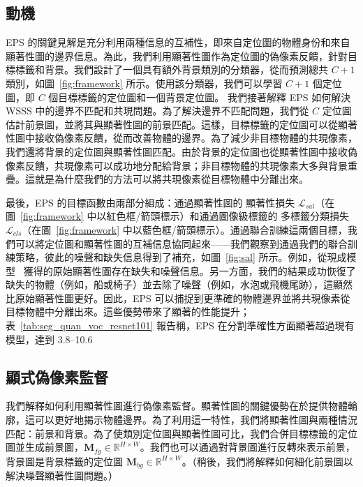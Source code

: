 \documentclass[final]{cvpr}
\begin{document}
\subsection{動機}
\label{section3.1}

EPS 的關鍵見解是充分利用兩種信息的互補性，即來自定位圖的物體身份和來自顯著性圖的邊界信息。為此，我們利用顯著性圖作為定位圖的偽像素反饋，針對目標標籤和背景。我們設計了一個具有額外背景類別的分類器，從而預測總共 $C+1$ 類別，如圖~\ref{fig:framework} 所示。使用該分類器，我們可以學習 $C+1$ 個定位圖，即 $C$ 個目標標籤的定位圖和一個背景定位圖。
我們接著解釋 EPS 如何解決 WSSS 中的邊界不匹配和共現問題。為了解決邊界不匹配問題，我們從 $C$ 定位圖估計前景圖，並將其與顯著性圖的前景匹配。這樣，目標標籤的定位圖可以從顯著性圖中接收偽像素反饋，從而改善物體的邊界。為了減少非目標物體的共現像素，我們還將背景的定位圖與顯著性圖匹配。由於背景的定位圖也從顯著性圖中接收偽像素反饋，共現像素可以成功地分配給背景；非目標物體的共現像素大多與背景重疊。這就是為什麼我們的方法可以將共現像素從目標物體中分離出來。

最後，EPS 的目標函數由兩部分組成：通過顯著性圖的 {顯著性損失} $\mathcal{L}_{sal}$（在圖~\ref{fig:framework} 中以紅色框/箭頭標示）和通過圖像級標籤的 {多標籤分類損失} $\mathcal{L}_{cls}$（在圖~\ref{fig:framework} 中以藍色框/箭頭標示）。通過聯合訓練這兩個目標，我們可以將定位圖和顯著性圖的互補信息協同起來——我們觀察到通過我們的聯合訓練策略，彼此的噪聲和缺失信息得到了補充，如圖~\ref{fig:sal} 所示。例如，從現成模型~\cite{hou2017deeply,nguyen2019deepusps,zhao2019pyramid} 獲得的原始顯著性圖存在缺失和噪聲信息。另一方面，我們的結果成功恢復了缺失的物體（例如，船或椅子）並去除了噪聲（例如，水泡或飛機尾跡），這顯然比原始顯著性圖更好。因此，EPS 可以捕捉到更準確的物體邊界並將共現像素從目標物體中分離出來。這些優勢帶來了顯著的性能提升；表~\ref{tab:seg_quan_voc_resnet101} 報告稱，EPS 在分割準確性方面顯著超過現有模型，達到 3.8--10.6%

\subsection{顯式偽像素監督}\label{section3.2}

我們解釋如何利用顯著性圖進行偽像素監督。顯著性圖的關鍵優勢在於提供物體輪廓，這可以更好地揭示物體邊界。為了利用這一特性，我們將顯著性圖與兩種情況匹配：前景和背景。為了使類別定位圖與顯著性圖可比，我們合併目標標籤的定位圖並生成前景圖，$\mathbf{M}_{fg} \in \mathbb{R}^{H \times W}$。我們也可以通過對背景圖進行反轉來表示前景，背景圖是背景標籤的定位圖 $\mathbf{M}_{bg} \in \mathbb{R}^{H \times W}$。（稍後，我們將解釋如何細化前景圖以解決噪聲顯著性圖問題。）
\end{document}
